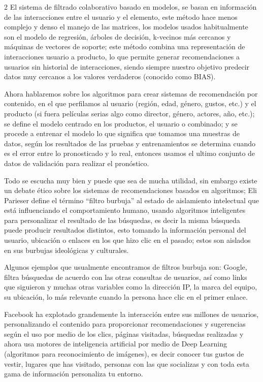 \documentclass[12pt,spanish,Letterpaper,openany]{book}
\begin{document}
\begin {multicols}{2}
El sistema de filtrado colaborativo basado en modelos, se basan en información de las interacciones entre el usuario y el elemento, este método hace menos complejo y denso el manejo de las matrices, los modelos usados habitualmente son el modelo de regresión, árboles de decisión, k-vecinos más cercanos y máquinas de vectores de soporte; este método combina una representación de interacciones usuario a producto, lo que permite generar recomendaciones a usuarios sin historial de interacciones, siendo siempre nuestro objetivo predecir datos muy cercanos a los valores verdaderos (conocido como BIAS).

Ahora hablaremos sobre los algoritmos para crear sistemas de recomendación por contenido, en el que perfilamos al usuario (región, edad, género, gustos, etc.) y el producto (si fuera películas serias algo como director, género, actores, año, etc.); se define el modelo centrado en los productos, el usuario o combinado; y se procede a entrenar el modelo lo que significa que tomamos una muestras de datos, según los resultados de las pruebas y entrenamientos se determina cuando es el error entre lo pronosticado y lo real, entonces usamos el ultimo conjunto de datos de validación para realizar el pronóstico.

Todo se escucha muy bien y puede que sea de mucha utilidad, sin embargo existe un debate ético sobre los sistemas de recomendaciones basados en algoritmos; Eli Parieser define el término ``filtro burbuja'' al estado de aislamiento intelectual que está influenciando el comportamiento humano, usando algoritmos inteligentes para personalizar el resultado de las búsquedas, es decir la misma búsqueda puede producir resultados distintos, esto tomando la información personal del usuario, ubicación o enlaces en los que hizo clic en el pasado; estos son aislados en sus burbujas ideológicas y culturales.

Algunos ejemplos que usualmente encontramos de filtros burbuja son: Google, filtra búsquedas de acuerdo con las otras consultas de usuarios, así como links que siguieron y muchas otras variables como la dirección IP, la marca del equipo, su ubicación, lo más relevante cuando la persona hace clic en el primer enlace.

Facebook ha explotado grandemente la interacción entre sus millones de usuarios, personalizando el contenido para proporcionar recomendaciones y sugerencias según el uso por medio de los clics, páginas visitadas, búsquedas realizadas y ahora usa motores de inteligencia artificial por medio de Deep Learning (algoritmos para reconocimiento de imágenes), es decir conocer tus gustos de vestir, lugares que has visitado, personas con las que socializas y con toda esta gama de información personaliza tu entorno.


\end{multicols}
\end{document}
